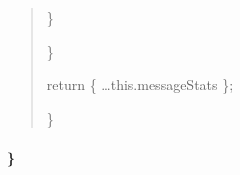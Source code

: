 \documentclass[letterpaper,10pt,english]{sphinxmanual}
\begin{document}
\begin{quote}
\begin{description}
\begin{description}
\end{description}

\sphinxAtStartPar
\}

\end{description}

\sphinxAtStartPar
\}
\begin{description}
\sphinxAtStartPar
return \{ …this.messageStats \};

\end{description}

\sphinxAtStartPar
\}
\end{quote}


\paragraph{\}}
\label{\detokenize{api/websocket-api:id184}}
\end{document}
